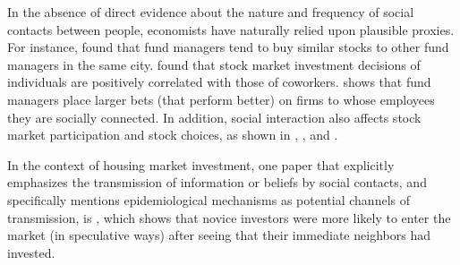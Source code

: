 In the absence of direct evidence about the nature and frequency of social contacts between people, economists have naturally relied upon plausible proxies.   For instance,  \href{http://www.columbia.edu/~hh2679/ThyNeighborJF.pdf}{\cite{hong2005thy}} found that fund managers tend to buy similar stocks to other fund managers in the same city. \href{https://github.com/iworld1991/EpiExp/blob/master/Literature/hvide2015social.pdf}{\cite{hvide2015social}} found that stock market investment decisions of individuals are positively correlated with those of coworkers.  \href{https://www.jstor.org/stable/10.1086/592415}{\cite{cohen2008small}} shows that fund managers place larger bets (that perform better) on firms to whose employees they are socially connected.  In addition, social interaction also affects stock market participation and stock choices, as shown in  \href{https://github.com/iworld1991/EpiExp/blob/master/Literature/hong2004social.pdf}{\cite{hong2004social}}, \href{https://onlinelibrary.wiley.com/doi/abs/10.1111/j.1540-6261.2008.01364.x}{\cite{brown2008neighbors}}, and \href{https://github.com/iworld1991/EpiExp/blob/master/Literature/ivkovic2007information.pdf}{\cite{ivkovic2007information}}. %

In the context of housing market investment, one paper that explicitly emphasizes the transmission of information or beliefs by social contacts, and specifically mentions epidemiological mechanisms as potential channels of transmission, is
 \href{https://www.aeaweb.org/articles?id=10.1257/aer.20171611&from=f}{\cite{bayer2021speculative}}, which shows that novice investors were more likely to enter the market (in speculative ways) after seeing that their immediate neighbors had invested.



